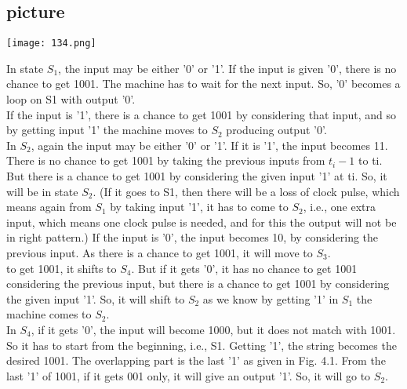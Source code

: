 \documentclass{article}
\begin{document}
\begin{center}
\section{picture}
\texttt{[image: 134.png]}
\end{center}

\hspace*{0.5cm} In state $S_1$, the input may be either '0' or '1'. If the input is given '0', there is no chance to get 1001.
The machine has to wait for the next input. So, '0' becomes a loop on S1 with output '0'.\\
\hspace*{0.5cm} If the input is '1', there is a chance to get 1001 by considering that input, and so by getting input '1'
the machine moves to $S_2$ producing output '0'.\\
\hspace*{0.5cm} In $S_2$, again the input may be either '0' or '1'. If it is '1', the input becomes 11. There is no chance
to get 1001 by taking the previous inputs from $t_i-1$ to ti. But there is a chance to get 1001 by considering
the given input '1' at ti. So, it will be in state $S_2$. (If it goes to S1, then there will be a loss of clock pulse,
which means again from $S_1$ by taking input '1', it has to come to $S_2$, i.e., one extra input, which means
one clock pulse is needed, and for this the output will not be in right pattern.) If the input is '0', the
input becomes 10, by considering the previous input. As there is a chance to get 1001, it will move to $S_3$.\\

to get 1001, it shifts to $S_4$. But if it gets '0', it has no chance to get 1001 considering the previous input,
but there is a chance to get 1001 by considering the given input '1'. So, it will shift to $S_2$ as we know by
getting '1' in $S_1$ the machine comes to $S_2$.\\
\hspace*{0.5cm} In $S_4$, if it gets '0', the input will become 1000, but it does not match with 1001. So it has to start from the
beginning, i.e., S1. Getting '1', the string becomes the desired 1001. The overlapping part is the last '1' as
given in Fig. 4.1. From the last '1' of 1001, if it gets 001 only, it will give an output '1'. So, it will go to $S_2$.\\
\end{document}
